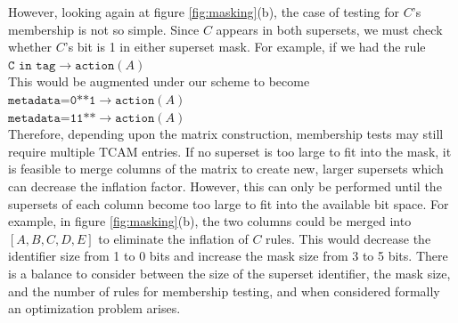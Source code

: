 However, looking again at figure \ref{fig:masking}(b), the case of testing for $C$'s membership is not so simple. Since $C$ appears in both supersets, we must check whether $C$'s bit is 1 in either superset mask. For example, if we had the rule\\
\noindent
{%
$\texttt{C in tag} \rightarrow \texttt{action}(A)$\\
}
This would be augmented under our scheme to become\\
\noindent
{%
$\texttt{metadata=0**1} \rightarrow \texttt{action}(A)$\\
$\texttt{metadata=11**} \rightarrow \texttt{action}(A)$\\
}
Therefore, depending upon the matrix construction, membership tests may still require multiple TCAM entries. If no superset is too large to fit into the mask, it is feasible to merge columns of the matrix to create new, larger supersets which can decrease the inflation factor. However, this can only be performed until the supersets of each column become too large to fit into the available bit space. For example, in figure \ref{fig:masking}(b), the two columns could be merged into $[A,B,C,D,E]$ to eliminate the inflation of $C$ rules. This would decrease the identifier size from 1 to 0 bits and increase the mask size from 3 to 5 bits. There is a 
balance to consider between the size of the superset identifier, the mask size, and the number of rules for membership testing, and when considered formally an optimization problem arises.

